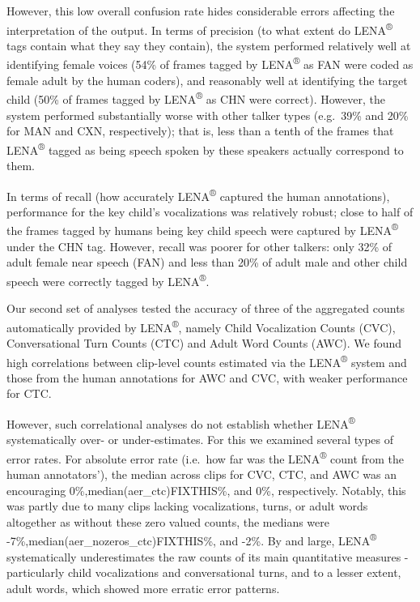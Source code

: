 \documentclass[english,table,man,floatsintext]{apa6}
\begin{document}
However, this low overall confusion rate hides considerable errors affecting the interpretation of the output. In terms of precision (to what extent do LENA\textsuperscript{®} tags contain what they say they contain), the system performed relatively well at identifying female voices (54\% of frames tagged by LENA\textsuperscript{®} as FAN were coded as female adult by the human coders), and reasonably well at identifying the target child (50\% of frames tagged by LENA\textsuperscript{®} as CHN were correct). However, the system performed substantially worse with other talker types (e.g.~39\% and 20\% for MAN and CXN, respectively); that is, less than a tenth of the frames that LENA\textsuperscript{®} tagged as being speech spoken by these speakers actually correspond to them.

In terms of recall (how accurately LENA\textsuperscript{®} captured the human annotations), performance for the key child's vocalizations was relatively robust; close to half of the frames tagged by humans being key child speech were captured by LENA\textsuperscript{®} under the CHN tag. However, recall was poorer for other talkers: only 32\% of adult female near speech (FAN) and less than 20\% of adult male and other child speech were correctly tagged by LENA\textsuperscript{®}.

Our second set of analyses tested the accuracy of three of the aggregated counts automatically provided by LENA\textsuperscript{®}, namely Child Vocalization Counts (CVC), Conversational Turn Counts (CTC) and Adult Word Counts (AWC). We found high correlations between clip-level counts estimated via the LENA\textsuperscript{®} system and those from the human annotations for AWC and CVC, with weaker performance for CTC.

However, such correlational analyses do not establish whether LENA\textsuperscript{®} systematically over- or under-estimates. For this we examined several types of error rates. For absolute error rate (i.e.~how far was the LENA\textsuperscript{®} count from the human annotators'), the median across clips for CVC, CTC, and AWC was an encouraging 0\%,median(aer\_ctc)FIXTHIS\%, and 0\%, respectively. Notably, this was partly due to many clips lacking vocalizations, turns, or adult words altogether as without these zero valued counts, the medians were -7\%,median(aer\_nozeros\_ctc)FIXTHIS\%, and -2\%. By and large, LENA\textsuperscript{®} systematically underestimates the raw counts of its main quantitative measures - particularly child vocalizations and conversational turns, and to a lesser extent, adult words, which showed more erratic error patterns.
\end{document}
